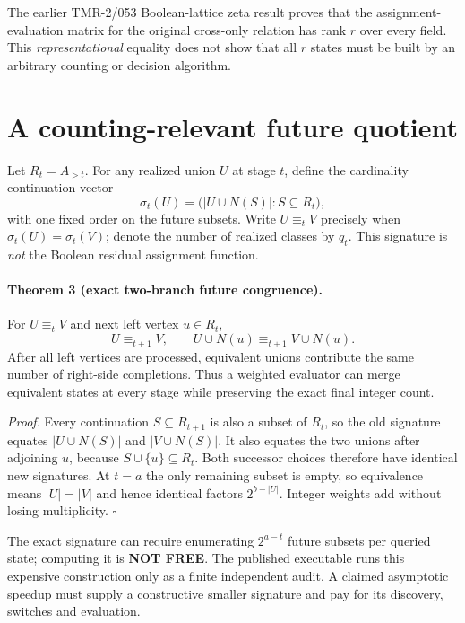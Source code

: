 \documentclass[11pt]{article}
\begin{document}
The earlier TMR-2/053 Boolean-lattice zeta result proves that the assignment-evaluation matrix for the original cross-only relation has rank $r$ over every field. This \emph{representational} equality does not show that all $r$ states must be built by an arbitrary counting or decision algorithm.

\section{A counting-relevant future quotient}
Let $R_t=A_{>t}$. For any realized union $U$ at stage $t$, define the cardinality continuation vector
\[
\sigma_t(U)=\bigl(|U\cup N(S)|:S\subseteq R_t\bigr),
\]
with one fixed order on the future subsets. Write $U\equiv_t V$ precisely when $\sigma_t(U)=\sigma_t(V)$; denote the number of realized classes by $q_t$. This signature is \emph{not} the Boolean residual assignment function.

\paragraph{Theorem 3 (exact two-branch future congruence).}
For $U\equiv_t V$ and next left vertex $u\in R_t$,
\[
U\equiv_{t+1}V,\qquad
U\cup N(u)\equiv_{t+1}V\cup N(u).
\]
After all left vertices are processed, equivalent unions contribute the same number of right-side completions. Thus a weighted evaluator can merge equivalent states at every stage while preserving the exact final integer count.

\emph{Proof.} Every continuation $S\subseteq R_{t+1}$ is also a subset of $R_t$, so the old signature equates $|U\cup N(S)|$ and $|V\cup N(S)|$. It also equates the two unions after adjoining $u$, because $S\cup\{u\}\subseteq R_t$. Both successor choices therefore have identical new signatures. At $t=a$ the only remaining subset is empty, so equivalence means $|U|=|V|$ and hence identical factors $2^{b-|U|}$. Integer weights add without losing multiplicity. \hfill$\square$

The exact signature can require enumerating $2^{a-t}$ future subsets per queried state; computing it is \textbf{NOT FREE}. The published executable runs this expensive construction only as a finite independent audit. A claimed asymptotic speedup must supply a constructive smaller signature and pay for its discovery, switches and evaluation.
\end{document}
